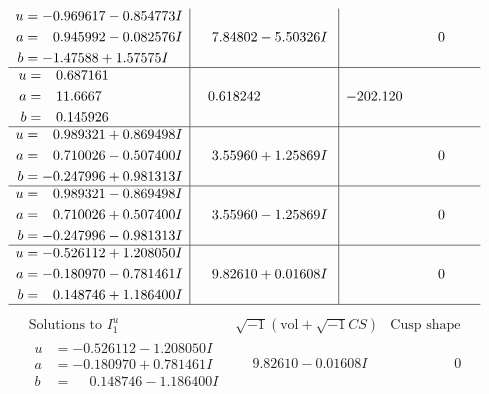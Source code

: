 \documentclass[1p]{elsarticle_modified}
\theoremstyle{definition}
\newcommand{\I}{\sqrt{-1}}
\begin{document}
$$\begin{array}{c|c|c}
\begin{aligned}
u &= -0.969617 - 0.854773 I \\
a &= \phantom{-}0.945992 - 0.082576 I \\
b &= -1.47588 + 1.57575 I\end{aligned}
 & \phantom{-}7.84802 - 5.50326 I & \phantom{-0.000000 } 0 \\ \hline\begin{aligned}
u &= \phantom{-}0.687161\phantom{ +0.000000I} \\
a &= \phantom{-}11.6667\phantom{ +0.000000I} \\
b &= \phantom{-}0.145926\phantom{ +0.000000I}\end{aligned}
 & \phantom{-}0.618242\phantom{ +0.000000I} & -202.120\phantom{ +0.000000I} \\ \hline\begin{aligned}
u &= \phantom{-}0.989321 + 0.869498 I \\
a &= \phantom{-}0.710026 - 0.507400 I \\
b &= -0.247996 + 0.981313 I\end{aligned}
 & \phantom{-}3.55960 + 1.25869 I & \phantom{-0.000000 } 0 \\ \hline\begin{aligned}
u &= \phantom{-}0.989321 - 0.869498 I \\
a &= \phantom{-}0.710026 + 0.507400 I \\
b &= -0.247996 - 0.981313 I\end{aligned}
 & \phantom{-}3.55960 - 1.25869 I & \phantom{-0.000000 } 0 \\ \hline\begin{aligned}
u &= -0.526112 + 1.208050 I \\
a &= -0.180970 - 0.781461 I \\
b &= \phantom{-}0.148746 + 1.186400 I\end{aligned}
 & \phantom{-}9.82610 + 0.01608 I & \phantom{-0.000000 } 0\\
 \hline 
 \end{array}$$\newpage$$\begin{array}{c|c|c}  
\text{Solutions to }I^u_{1}& \I (\text{vol} + \sqrt{-1}CS) & \text{Cusp shape}\\
 \hline 
\begin{aligned}
u &= -0.526112 - 1.208050 I \\
a &= -0.180970 + 0.781461 I \\
b &= \phantom{-}0.148746 - 1.186400 I\end{aligned}
 & \phantom{-}9.82610 - 0.01608 I & \phantom{-0.000000 } 0 \\ \hline\begin{aligned}

\end{aligned}
\end{array}$$
\end{document}
